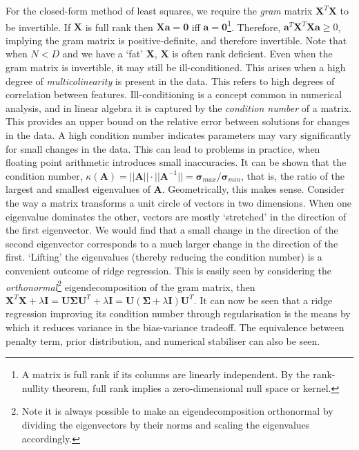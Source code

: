 \documentclass[11pt]{amsart}
\begin{document}
For the closed-form method of least squares, we require the \emph{gram} matrix $\mathbf{X}^T\mathbf{X}$ to be invertible. If $\mathbf{X}$ is full rank then $\mathbf{X}\mathbf{a} = \mathbf{0}$ iff $\mathbf{a} = \mathbf{0}$\footnote{A matrix is full rank if its columns are linearly independent. By the rank-nullity theorem, full rank implies a zero-dimensional null space or kernel.}. Therefore, $\mathbf{a}^T\mathbf{X}^T\mathbf{X}\mathbf{a} \geq 0$, implying the gram matrix is positive-definite, and therefore invertible. Note that when $N < D$ and we have a `fat' $\mathbf{X}$, $\mathbf{X}$ is often rank deficient. Even when the gram matrix is invertible, it may still be ill-conditioned. This arises when a high degree of \emph{multicolinearity} is present in the data. This refers to high degrees of correlation between features. Ill-conditioning is a concept common in numerical analysis, and in linear algebra it is captured by the \emph{condition number} of a matrix. This provides an upper bound on the relative error between solutions for changes in the data. A high condition number indicates parameters may vary significantly for small changes in the data. This can lead to problems in practice, when floating point arithmetic introduces small inaccuracies. It can be shown that the condition number, $\kappa({\mathbf{A}}) = ||\mathbf{A}||\cdot||\mathbf{A}^{-1}|| = \boldsymbol\sigma_{max}/\boldsymbol\sigma_{min}$, that is, the ratio of the largest and smallest eigenvalues of $\mathbf{A}$. Geometrically, this makes sense. Consider the way a matrix transforms a unit circle of vectors in two dimensions. When one eigenvalue dominates the other, vectors are mostly `stretched' in the direction of the first eigenvector. We would find that a small change in the direction of the second eigenvector corresponds to a much larger change in the direction of the first. `Lifting' the eigenvalues (thereby reducing the condition number) is a convenient outcome of ridge regression. This is easily seen by considering the \emph{orthonormal}\footnote{Note it is always possible to make an eigendecomposition orthonormal by dividing the eigenvectors by their norms and scaling the eigenvalues accordingly.} eigendecomposition of the gram matrix, then $\mathbf{X}^T\mathbf{X} + \lambda\mathbf{I} = \mathbf{U}\boldsymbol\Sigma\mathbf{U}^T + \lambda\mathbf{I} = \mathbf{U}(\boldsymbol\Sigma + \lambda\mathbf{I})\mathbf{U}^T$. It can now be seen that a ridge regression improving its condition number through regularisation is the means by which it reduces variance in the bias-variance tradeoff. The equivalence between penalty term, prior distribution, and numerical stabiliser can also be seen.
\end{document}
